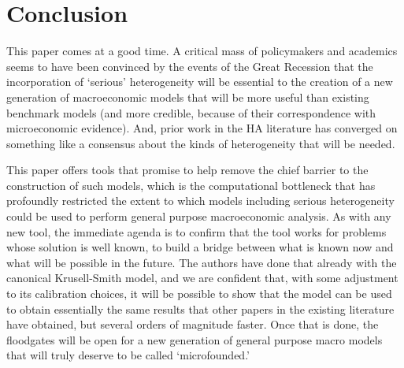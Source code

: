 \documentclass[titlepage]{econtex}
\begin{document}
\section{Conclusion}

This paper comes at a good time.  A critical mass of policymakers and academics seems to have been convinced by the events of the Great Recession that the incorporation of `serious' heterogeneity will be essential to the creation of a new generation of macroeconomic models that will be more useful than existing benchmark models (and more credible, because of their correspondence with microeconomic evidence).  And, prior work in the HA literature has converged on something like a consensus about the kinds of heterogeneity that will be needed.  

This paper offers tools that promise to help remove the chief barrier to the construction of such models, which is the computational bottleneck that has profoundly restricted the extent to which models including serious heterogeneity could be used to perform general purpose macroeconomic analysis.  As with any new tool, the immediate agenda is to confirm that the tool works for problems whose solution is well known, to build a bridge between what is known now and what will be possible in the future.  The authors have done that already with the canonical Krusell-Smith model, and we are confident that, with some adjustment to its calibration choices, it will be possible to show that the model can be used to obtain essentially the same results that other papers in the existing literature have obtained, but several orders of magnitude faster.  Once that is done, the floodgates will be open for a new generation of general purpose macro models that will truly deserve to be called `microfounded.'

\normalsize


\end{document}
